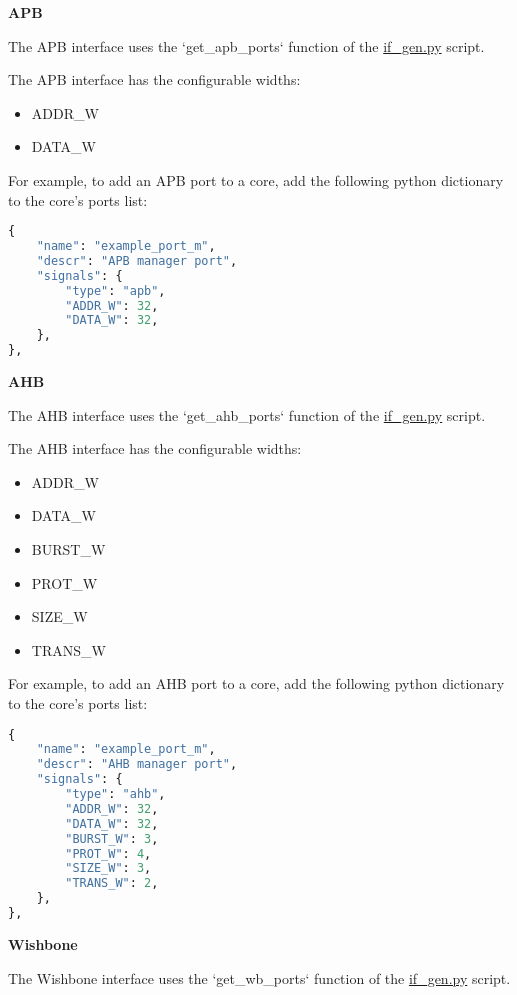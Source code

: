 %
%
\clearpage
\large\textbf{APB}

The APB interface uses the `get\_apb\_ports` function of the \href{https://github.com/IObundle/py2hwsw/blob/main/py2hwsw/scripts/if_gen.py}{if\_gen.py} script.


The APB interface has the configurable widths:
\begin{itemize}
  \item ADDR\_W
  \item DATA\_W
\end{itemize}

For example, to add an APB port to a core, add the following python dictionary to the core's ports list:
\begin{lstlisting}[language=python]
{
	"name": "example_port_m",
	"descr": "APB manager port",
	"signals": {
		"type": "apb",
		"ADDR_W": 32,
		"DATA_W": 32,
	},
},
\end{lstlisting}


%
%
\clearpage
\large\textbf{AHB}

The AHB interface uses the `get\_ahb\_ports` function of the \href{https://github.com/IObundle/py2hwsw/blob/main/py2hwsw/scripts/if_gen.py}{if\_gen.py} script.


The AHB interface has the configurable widths:
\begin{itemize}
  \item ADDR\_W
  \item DATA\_W
  \item BURST\_W
  \item PROT\_W
  \item SIZE\_W
  \item TRANS\_W
\end{itemize}

For example, to add an AHB port to a core, add the following python dictionary to the core's ports list:
\begin{lstlisting}[language=python]
{
	"name": "example_port_m",
	"descr": "AHB manager port",
	"signals": {
		"type": "ahb",
		"ADDR_W": 32,
		"DATA_W": 32,
		"BURST_W": 3,
		"PROT_W": 4,
		"SIZE_W": 3,
		"TRANS_W": 2,
	},
},
\end{lstlisting}


%
%
\clearpage
\large\textbf{Wishbone}

The Wishbone interface uses the `get\_wb\_ports` function of the \href{https://github.com/IObundle/py2hwsw/blob/main/py2hwsw/scripts/if_gen.py}{if\_gen.py} script.

